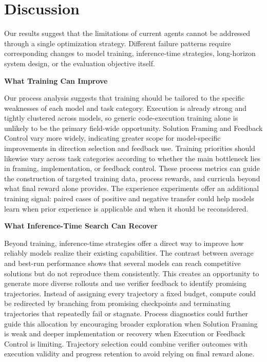 \section{Discussion}

Our results suggest that the limitations of current agents cannot be addressed through a single optimization strategy.
Different failure patterns require corresponding changes to model training, inference-time strategies, long-horizon system design, or the evaluation objective itself.

\textbf{What Training Can Improve}

Our process analysis suggests that training should be tailored to the specific weaknesses of each model and task category.
Execution is already strong and tightly clustered across models, so generic code-execution training alone is unlikely to be the primary field-wide opportunity.
Solution Framing and Feedback Control vary more widely, indicating greater scope for model-specific improvements in direction selection and feedback use.
Training priorities should likewise vary across task categories according to whether the main bottleneck lies in framing, implementation, or feedback control.
These process metrics can guide the construction of targeted training data, process rewards, and curricula beyond what final reward alone provides.
The experience experiments offer an additional training signal: paired cases of positive and negative transfer could help models learn when prior experience is applicable and when it should be reconsidered.

\textbf{What Inference-Time Search Can Recover}

Beyond training, inference-time strategies offer a direct way to improve how reliably models realize their existing capabilities.
The contrast between average and best-run performance shows that several models can reach competitive solutions but do not reproduce them consistently.
This creates an opportunity to generate more diverse rollouts and use verifier feedback to identify promising trajectories.
Instead of assigning every trajectory a fixed budget, compute could be redirected by branching from promising checkpoints and terminating trajectories that repeatedly fail or stagnate.
Process diagnostics could further guide this allocation by encouraging broader exploration when Solution Framing is weak and deeper implementation or recovery when Execution or Feedback Control is limiting.
Trajectory selection could combine verifier outcomes with execution validity and progress retention to avoid relying on final reward alone.

